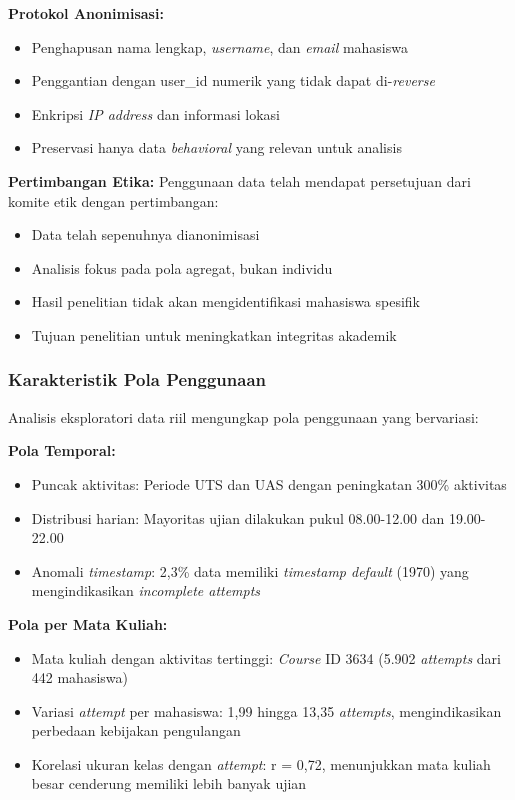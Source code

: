 \textbf{Protokol Anonimisasi:}
\begin{itemize}
    \item Penghapusan nama lengkap, \textit{username}, dan \textit{email} mahasiswa
    \item Penggantian dengan user\_id numerik yang tidak dapat di-\textit{reverse}
    \item Enkripsi \textit{IP address} dan informasi lokasi
    \item Preservasi hanya data \textit{behavioral} yang relevan untuk analisis
\end{itemize}

\textbf{Pertimbangan Etika:}
Penggunaan data telah mendapat persetujuan dari komite etik dengan pertimbangan:
\begin{itemize}
    \item Data telah sepenuhnya dianonimisasi
    \item Analisis fokus pada pola agregat, bukan individu
    \item Hasil penelitian tidak akan mengidentifikasi mahasiswa spesifik
    \item Tujuan penelitian untuk meningkatkan integritas akademik
\end{itemize}

\subsubsection{Karakteristik Pola Penggunaan}
\label{sec:karakteristikPolaPenggunaan}

Analisis eksploratori data riil mengungkap pola penggunaan yang bervariasi:

\textbf{Pola Temporal:}
\begin{itemize}
    \item Puncak aktivitas: Periode UTS dan UAS dengan peningkatan 300\% aktivitas
    \item Distribusi harian: Mayoritas ujian dilakukan pukul 08.00-12.00 dan 19.00-22.00
    \item Anomali \textit{timestamp}: 2,3\% data memiliki \textit{timestamp default} (1970) yang mengindikasikan \textit{incomplete attempts}
\end{itemize}

\textbf{Pola per Mata Kuliah:}
\begin{itemize}
    \item Mata kuliah dengan aktivitas tertinggi: \textit{Course} ID 3634 (5.902 \textit{attempts} dari 442 mahasiswa)
    \item Variasi \textit{attempt} per mahasiswa: 1,99 hingga 13,35 \textit{attempts}, mengindikasikan perbedaan kebijakan pengulangan
    \item Korelasi ukuran kelas dengan \textit{attempt}: r = 0,72, menunjukkan mata kuliah besar cenderung memiliki lebih banyak ujian
\end{itemize}

